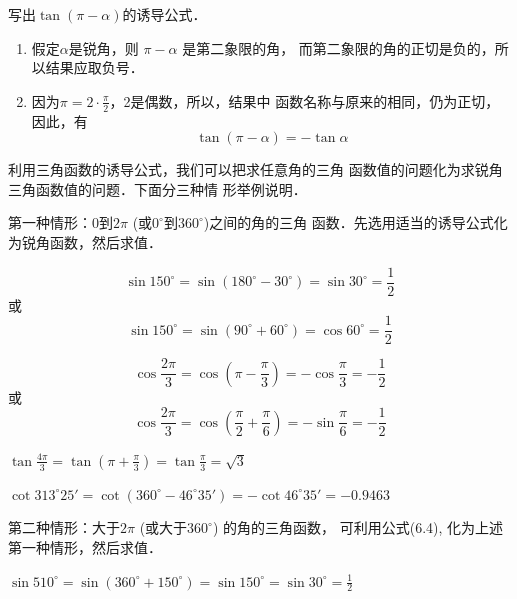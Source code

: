 \begin{example}
    写出$\tan(\pi-\alpha)$的诱导公式．
\end{example}

\begin{solution}
\begin{enumerate}
    \item 假定$\alpha$是锐角，则
$\pi -\alpha$ 是第二象限的角，
而第二象限的角的正切是负的，所以结果应取负号．
\item 因为$\pi =2\cdot\frac{\pi}{2}$，2是偶数，所以，结果中
函数名称与原来的相同，仍为正切，因此，有
\[\tan(\pi -\alpha )=-\tan\alpha \]
\end{enumerate}
\end{solution}

利用三角函数的诱导公式，我们可以把求任意角的三角
函数值的问题化为求锐角三角函数值的问题．下面分三种情
形举例说明．

第一种情形：0到$2\pi$ (或$0^{\circ}$到$360^{\circ}$)之间的角的三角
函数．先选用适当的诱导公式化为锐角函数，然后求值．

\begin{example}
\[\sin 150^{\circ}=\sin(180^{\circ}-30^{\circ})=\sin30^{\circ}=\frac{1}{2}\]
或
  \[\sin 150^{\circ}=\sin(90^{\circ}+60^{\circ})=\cos60^{\circ}=\frac{1}{2}\]  
\end{example}

\begin{example}
\[\cos\frac{2\pi}{3}=\cos\left(\pi-\frac{\pi}{3}\right)=-\cos\frac{\pi}{3}=-\frac{1}{2}\]
或
\[\cos\frac{2\pi}{3}=\cos\left(\frac{\pi}{2}+\frac{\pi}{6}\right)=-\sin\frac{\pi}{6}=-\frac{1}{2}\]
\end{example}

\begin{example}
    $\tan\frac{4\pi}{3}=\tan\left(\pi+\frac{\pi}{3}\right)=\tan\frac{\pi}{3}=\sqrt{3}$
\end{example}

\begin{example}
$\cot313^{\circ}25'=\cot(360^{\circ}-46^{\circ}35')=-\cot46^{\circ}35'=-0.9463$
\end{example}

第二种情形：大于$2\pi$ (或大于$360^{\circ}$) 的角的三角函数，
可利用公式(6.4), 化为上述第一种情形，然后求值．

\begin{example}
    $\sin 510^{\circ}=\sin(360^{\circ}+150^{\circ})=\sin150^{\circ}=\sin30^{\circ}=\frac{1}{2}$
\end{example}



